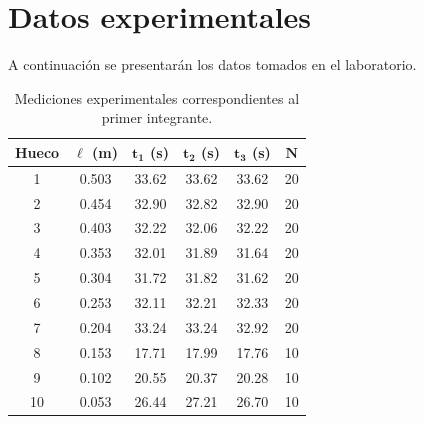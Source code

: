 \documentclass[11pt,a4paper]{article}
\begin{document}
\newpage
\section{Datos experimentales}

A continuación se presentarán los datos tomados en el laboratorio.

\vspace{0.2cm}

\begin{table}[H]
    \centering
    \small
    \renewcommand{\arraystretch}{0.92}
    \setlength{\tabcolsep}{9pt}

    \begin{tabular}{cccccc}
        \toprule
        \textbf{Hueco} &
        $\boldsymbol{\ell}$ \textbf{(m)} &
        $\boldsymbol{t_1}$ \textbf{(s)} &
        $\boldsymbol{t_2}$ \textbf{(s)} &
        $\boldsymbol{t_3}$ \textbf{(s)} &
        $\boldsymbol{N}$ \\
        \midrule

        1  & 0.503 & 33.62 & 33.62 & 33.62 & 20 \\
        2  & 0.454 & 32.90 & 32.82 & 32.90 & 20 \\
        3  & 0.403 & 32.22 & 32.06 & 32.22 & 20 \\
        4  & 0.353 & 32.01 & 31.89 & 31.64 & 20 \\
        5  & 0.304 & 31.72 & 31.82 & 31.62 & 20 \\
        6  & 0.253 & 32.11 & 32.21 & 32.33 & 20 \\
        7  & 0.204 & 33.24 & 33.24 & 32.92 & 20 \\
        8  & 0.153 & 17.71 & 17.99 & 17.76 & 10 \\
        9  & 0.102 & 20.55 & 20.37 & 20.28 & 10 \\
        10 & 0.053 & 26.44 & 27.21 & 26.70 & 10 \\

        \bottomrule
    \end{tabular}

    \caption{Mediciones experimentales correspondientes al primer integrante.}
    \label{tab:datos_integrante1}
\end{table}

\vspace{-0.25cm}
\end{document}
